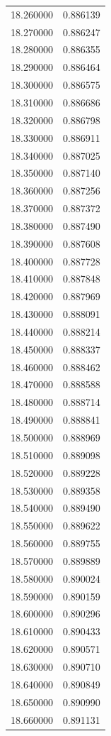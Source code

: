 \begin{tabular}{rr}
18.260000 & 0.886139 \\
18.270000 & 0.886247 \\
18.280000 & 0.886355 \\
18.290000 & 0.886464 \\
18.300000 & 0.886575 \\
18.310000 & 0.886686 \\
18.320000 & 0.886798 \\
18.330000 & 0.886911 \\
18.340000 & 0.887025 \\
18.350000 & 0.887140 \\
18.360000 & 0.887256 \\
18.370000 & 0.887372 \\
18.380000 & 0.887490 \\
18.390000 & 0.887608 \\
18.400000 & 0.887728 \\
18.410000 & 0.887848 \\
18.420000 & 0.887969 \\
18.430000 & 0.888091 \\
18.440000 & 0.888214 \\
18.450000 & 0.888337 \\
18.460000 & 0.888462 \\
18.470000 & 0.888588 \\
18.480000 & 0.888714 \\
18.490000 & 0.888841 \\
18.500000 & 0.888969 \\
18.510000 & 0.889098 \\
18.520000 & 0.889228 \\
18.530000 & 0.889358 \\
18.540000 & 0.889490 \\
18.550000 & 0.889622 \\
18.560000 & 0.889755 \\
18.570000 & 0.889889 \\
18.580000 & 0.890024 \\
18.590000 & 0.890159 \\
18.600000 & 0.890296 \\
18.610000 & 0.890433 \\
18.620000 & 0.890571 \\
18.630000 & 0.890710 \\
18.640000 & 0.890849 \\
18.650000 & 0.890990 \\
18.660000 & 0.891131 \\

\end{tabular}
